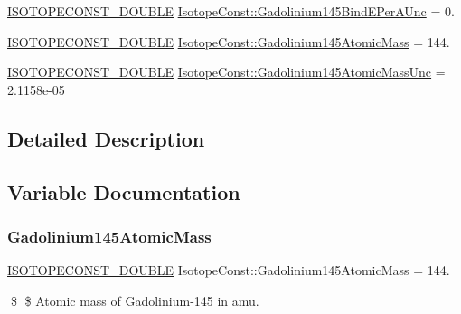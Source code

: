 \begin{DoxyCompactItemize}
\item 
\mbox{\hyperlink{group___isotope_const-_macros_ga8f45a7272ce02c0b4c65c44636ed719a}{I\+S\+O\+T\+O\+P\+E\+C\+O\+N\+S\+T\+\_\+\+D\+O\+U\+B\+LE}} \mbox{\hyperlink{group___isotope_const-_gadolinium-_gd145_gaad4b194b512835af51f9584208f0e3f3}{Isotope\+Const\+::\+Gadolinium145\+Bind\+E\+Per\+A\+Unc}} = 0.
\item 
\mbox{\hyperlink{group___isotope_const-_macros_ga8f45a7272ce02c0b4c65c44636ed719a}{I\+S\+O\+T\+O\+P\+E\+C\+O\+N\+S\+T\+\_\+\+D\+O\+U\+B\+LE}} \mbox{\hyperlink{group___isotope_const-_gadolinium-_gd145_ga57dc29837da3abb73c672e5948a20409}{Isotope\+Const\+::\+Gadolinium145\+Atomic\+Mass}} = 144.
\item 
\mbox{\hyperlink{group___isotope_const-_macros_ga8f45a7272ce02c0b4c65c44636ed719a}{I\+S\+O\+T\+O\+P\+E\+C\+O\+N\+S\+T\+\_\+\+D\+O\+U\+B\+LE}} \mbox{\hyperlink{group___isotope_const-_gadolinium-_gd145_ga0bde3f0b4b833b3b8f108c844686fe44}{Isotope\+Const\+::\+Gadolinium145\+Atomic\+Mass\+Unc}} = 2.\+1158e-\/05
\end{DoxyCompactItemize}


\subsection{Detailed Description}


\subsection{Variable Documentation}
\mbox{\label{group___isotope_const-_gadolinium-_gd145_ga57dc29837da3abb73c672e5948a20409}} 
\subsubsection{\texorpdfstring{Gadolinium145\+Atomic\+Mass}{Gadolinium145AtomicMass}}
{\footnotesize\ttfamily \mbox{\hyperlink{group___isotope_const-_macros_ga8f45a7272ce02c0b4c65c44636ed719a}{I\+S\+O\+T\+O\+P\+E\+C\+O\+N\+S\+T\+\_\+\+D\+O\+U\+B\+LE}} Isotope\+Const\+::\+Gadolinium145\+Atomic\+Mass = 144.}

\$ \$ Atomic mass of Gadolinium-\/145 in amu. \mbox{\label{group___isotope_const-_gadolinium-_gd145_ga0bde3f0b4b833b3b8f108c844686fe44}} 
